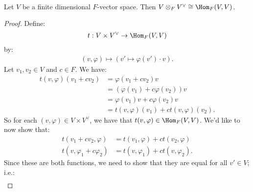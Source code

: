     \begin{lemma}
        Let $V$ be a finite dimensional $F$-vector space. Then $V \otimes_F V^\vee \cong \Hom_F(V,V)$.
    \end{lemma}
        \begin{proof}
            Define:
                \begin{equation*}
                \begin{split}
                    t: V \times V^\vee \rightarrow \Hom_F(V,V)
                \end{split}
                \end{equation*}
             by:
                \begin{equation*}
                \begin{split}
                    (v,\varphi) \mapsto (v' \mapsto \varphi(v')\cdot v).
                \end{split}
                \end{equation*} 
            Let $v_1,v_2 \in V$ and $c \in F$. We have:
                \begin{equation*}
                \begin{split}
                    t(v,\varphi)(v_1 + cv_2)
                    & = \varphi(v_1 + cv_2)v \\
                    & = (\varphi(v_1) + c\varphi(v_2))v \\
                    & = \varphi(v_1)v + c\varphi(v_2)v \\
                    & = t(v,\varphi)(v_1) + c t(v,\varphi)(v_2).
                \end{split}
                \end{equation*}
            So for each $(v,\varphi) \in V \times V^\vee$, we have that $t(v,\varphi) \in \Hom_F(V,V)$. We'd like to now show that:
                \begin{equation*}
                \begin{split}
                    t(v_1 + cv_2,\varphi) &= t(v_1,\varphi) + ct(v_2,\varphi) \\
                    t(v,\varphi_1 + c\varphi_2) &= t(v,\varphi_1) + ct(v,\varphi_2).
                \end{split}
                \end{equation*}
            Since these are both functions, we need to show that they are equal for all $v' \in V$; i.e.:
                \begin{equation*}
                \begin{split}

\end{split}
\end{equation*}
\end{proof}
